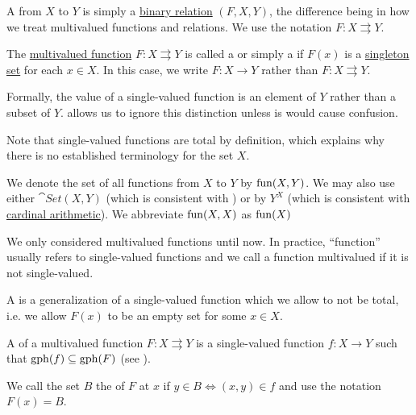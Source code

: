 \begin{definition}\label{def:function}
  A  from \( X \) to \( Y \) is simply a \hyperref[def:binary_relation]{binary relation} \( (F, X, Y) \), the difference being in how we treat multivalued functions and relations. We use the notation \( F: X \rightrightarrows Y \).

  \begin{thmenum}[series=def:function]
     The \hyperref[def:function/multivalued]{multivalued function} \( F: X \rightrightarrows Y \) is called a  or simply a  if \( F(x) \) is a \hyperref[rem:singleton_sets]{singleton set} for each \( x \in X \). In this case, we write \( F: X \to Y \) rather than \( F: X \rightrightarrows Y \).

    Formally, the value of a single-valued function is an element of \( Y \) rather than a subset of \( Y \).  allows us to ignore this distinction unless is would cause confusion.

    Note that single-valued functions are total by definition, which explains why there is no established terminology for the set \( X \).

    We denote the set of all functions from \( X \) to \( Y \) by \( \operatorname{fun}(X, Y) \). We may also use either \( \cat{Set}(X, Y) \) (which is consistent with ) or by \( Y^X \) (which is consistent with \hyperref[def:cardinal_arithmetic]{cardinal arithmetic}). We abbreviate \( \operatorname{fun}(X, X) \) as \( \operatorname{fun}(X) \)

     We only considered multivalued functions until now. In practice, \enquote{function} usually refers to single-valued functions and we call a function multivalued if it is not single-valued.

     A  is a generalization of a single-valued function which we allow to not be total, i.e. we allow \( F(x) \) to be an empty set for some \( x \in X \).

     A  of a multivalued function \( F: X \rightrightarrows Y \) is a single-valued function \( f: X \to Y \) such that \( \operatorname{gph}(f) \subseteq \operatorname{gph}(F) \) (see ).

     We call the set \( B \) the  of \( F \) at \( x \) if \( y \in B \iff (x, y) \in f \) and use the notation \( F(x) = B \).


\end{thmenum}
\end{definition}
